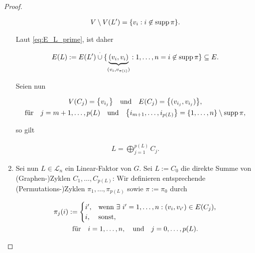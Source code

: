 \begin{proof}
\begin{enumerate}[label = \arabic*.]
                    \begin{align*}
                        V \setminus V(L^\prime)
                        =
                        {\left \{ v_i: i \not \in \operatorname{supp} \pi \right \}}.
                    \end{align*}

                    Laut \eqref{eq:E_L_prime}, ist daher

                    \begin{align*}
                        E(L)
                        :=
                        E(L^\prime) \overset{\cdot}{\cup} \{ \underbrace{(v_i, v_i)}_{(v_i, v_{\pi(i)})}: 1, \dots, n = i \not \in \operatorname{supp} \pi \}
                        \subseteq
                        E.
                    \end{align*}

                    Seien nun

                    \begin{gather*}
                        V(C_j) = {\left \{ v_{i_j} \right \}}
                        \quad
                        \text{und}
                        \quad
                        E(C_j) = {\left \{ (v_{i_j}, v_{i_j}) \right \}}, \\
                        \text{für}
                        \quad
                        j = m + 1, \dots, p(L)
                        \quad
                        \text{und}
                        \quad
                        {\left \{ i_{m+1}, \dots, i_{p(L)} \right \}} = {\left \{ 1, \dots, n \right \}} \setminus \operatorname{supp} \pi,
                    \end{gather*}

                    so gilt

                    \begin{align*}
                        L = \bigoplus_{j=1}^{p(L)} C_j.
                    \end{align*}

                    \item Sei nun $L \in \mathcal L_n$ ein Linear-Faktor von $G$.
                    Sei $L := C_0$ die direkte Summe von (Graphen-)Zyklen $C_1, \dots, C_{p(L)}$:
                    Wir definieren entsprechende (Permutations-)Zyklen $\pi_1, \dots, \pi_{p(L)}$ sowie $\pi := \pi_0$ durch

                    \begin{multline*}
                        \pi_j(i)
                        :=
                        \begin{cases}
                            i^\prime, & \text{wenn} ~ \exists ~ i^\prime = 1, \dots, n: (v_i, v_{i^\prime}) \in E(C_j), \\
                            i,        & \text{sonst},
                        \end{cases} \\
                        \text{für}
                        \quad
                        i = 1, \dots, n,
                        \quad
                        \text{und}
                        \quad
                        j = 0, \dots, p(L).
                    \end{multline*}


\end{enumerate}
\end{proof}
